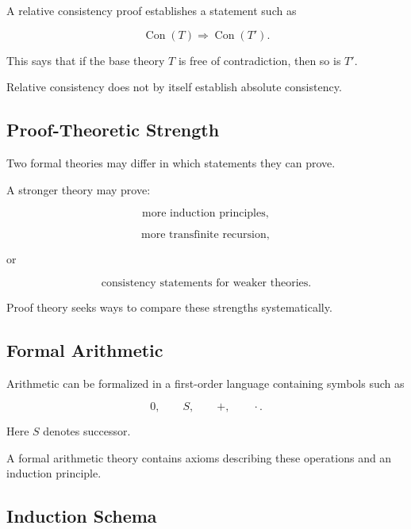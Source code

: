 A relative consistency proof establishes a statement such as

\[
\boxed{
\operatorname{Con}(T)
\Longrightarrow
\operatorname{Con}(T').
}
\]

This says that if the base theory \(T\) is free of contradiction, then so
is \(T'\).

Relative consistency does not by itself establish absolute consistency.

\subsection{Proof-Theoretic Strength}
\label{subsec:proof-theoretic-strength}

Two formal theories may differ in which statements they can prove.

A stronger theory may prove:

\[
\boxed{
\text{more induction principles},
}
\]

\[
\boxed{
\text{more transfinite recursion},
}
\]

or

\[
\boxed{
\text{consistency statements for weaker theories}.
}
\]

Proof theory seeks ways to compare these strengths systematically.

\subsection{Formal Arithmetic}
\label{subsec:formal-arithmetic-proof-theory}

Arithmetic can be formalized in a first-order language containing symbols
such as

\[
\boxed{
0,
\qquad
S,
\qquad
+,
\qquad
\cdot.
}
\]

Here \(S\) denotes successor.

A formal arithmetic theory contains axioms describing these operations and
an induction principle.

\subsection{Induction Schema}
\label{subsec:induction-schema-proof-theory}

